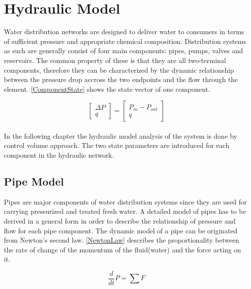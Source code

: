 \section{Hydraulic Model}
\label{HydraulicModel}

Water distribution networks are designed to deliver water to consumers in terms of sufficient pressure and appropriate chemical composition. Distribution systems as such are generally consist of four main components: pipes, pumps, valves and reservoirs. The common property of these is that they are all two-terminal components, therefore they can be characterized by the dynamic relationship between the pressure drop accross the two endpoints and the flow through the element. \cite{Kallesoe2009}  \eqref{ComponentState} shows the state vector of one component. 

\begin{equation}
\label{ComponentState}
 \begin{bmatrix}
    \Delta P \\
    q
\end{bmatrix}
=
 \begin{bmatrix}
    P_{in} - P_{out} \\
    q
\end{bmatrix}
\end{equation}
\\
In the following chapter the hydraulic model analysis of the system is done by control volume approach. \cite{Hunt_Fluidmechanics} 
The two state parameters are introduced for each component in the hydraulic network.


\subsection{Pipe Model} 
\label{PipeModel}
Pipes are major components of water distribution systems since they are used for carrying pressurized and treated fresh water. A detailed model of pipes has to be derived in a general form in order to describe the relationship of pressure and flow for each pipe component.  
%
The dynamic model of a pipe can be originated from Newton's second law. \eqref{NewtonLaw} describes the proportionality between the rate of change of the momentum of the fluid(water) and the force acting on it.

\begin{equation}
  \frac{d}{dt} P = \sum F
  \label{NewtonLaw}
\end{equation} 

